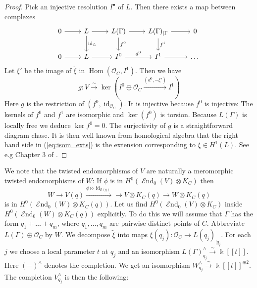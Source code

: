 \documentclass[12pt]{extarticle}
\theoremstyle{definition}
\numberwithin{theorem}{section}
\newcommand{\OO}{\mathcal{O}}
\newcommand{\isomarrow}{\xrightarrow{\sim}}
\newcommand{\op}{\operatorname}
\DeclareMathOperator{\End}{\mathcal{E}nd}
\renewcommand{\tilde}{\widetilde}		%
\begin{document}
\begin{proof}
Pick an injective resolution $I^\bullet$ of $L$. Then there exists a map between complexes 
\begin{equation*}
\begin{tikzcd}
	0 & L & {L(\Gamma)} & {L(\Gamma)_{|\Gamma}} & 0 \\
	0 & L & {I^0} & {I^1} & \ldots
	\arrow[from=1-1, to=1-2]
	\arrow[from=1-2, to=1-3]
	\arrow["{\operatorname{id}_L}", from=1-2, to=2-2]
	\arrow[from=1-3, to=1-4]
	\arrow["{f^0}", from=1-3, to=2-3]
	\arrow[from=1-4, to=1-5]
	\arrow["{f^1}", from=1-4, to=2-4]
	\arrow[from=2-1, to=2-2]
	\arrow[from=2-2, to=2-3]
	\arrow["{d^0}", from=2-3, to=2-4]
	\arrow[from=2-4, to=2-5]
\end{tikzcd}
\end{equation*}
Let $\xi'$ be the image of $\tilde{\xi}$ in $\op{Hom}(\OO_C,I^1)$. Then we have 
\begin{equation}\label{eq:isom_exts}
g: V \isomarrow \op{ker}\left( I^0 \oplus \OO_C \xrightarrow{(d^0,-\xi')} I^1\right)
\end{equation}
Here $g$ is the restriction of $(f^0,\op{id}_{\OO_C})$. It is injective because $f^0$ is injective: The kernels of $f^0$ and $f^1$ are isomorphic and $\ker(f^0)$ is torsion. Because $L(\Gamma)$ is locally free we deduce $\ker f^0 = 0$. The surjectivity of $g$ is a straightforward diagram chase. 
It is then well known from homological algebra that the right hand side in (\ref{eq:isom_exts}) is the extension corresponding to $\xi \in H^1(L)$. See e.g Chapter 3 of \cite{weibel}.
\end{proof}
We note that the twisted endomorphisms of $V$ are naturally a meromorphic twisted endomorphisms of $W$: If $\phi$ is in $H^0(\End_0(V)\otimes K_C)$ then 
\begin{equation*}
	W \to V(q) \xrightarrow{\phi\otimes \op{id}_{\OO(q)}} \to V\otimes K_C(q) \to W \otimes K_C(q)
\end{equation*}
is in $H^0(\End_0(W)\otimes K_C(q))$. Let us find $H^0(\End_0(V)\otimes K_C)$ inside $H^0(\End_0(W)\otimes K_C(q))$ explicitly.
To do this we will assume that $\Gamma$ has the form $q_1 + \ldots + q_m$, where $q_1,\ldots,q_m$ are pairwise distinct points of $C$. Abbreviate $L(\Gamma)\oplus \OO_C$ by $W$. We decompose $\tilde{\xi}$ into maps $\xi(q_j) : \OO_C \to L(q_j)_{|q_j}$.
For each $j$ we choose a local parameter $t$ at $q_j$ and an isomorphism $L(\Gamma)_{q_j}^\wedge \isomarrow \Bbbk[\![t]\!]$. Here $(-)^{\wedge}$ denotes the completion. We get an isomorphism $W^\wedge_{q_j} \isomarrow \Bbbk[\![t]\!]^{\oplus 2}$. The completion $V_{q_j}^\wedge$ is then the following:
\end{document}
